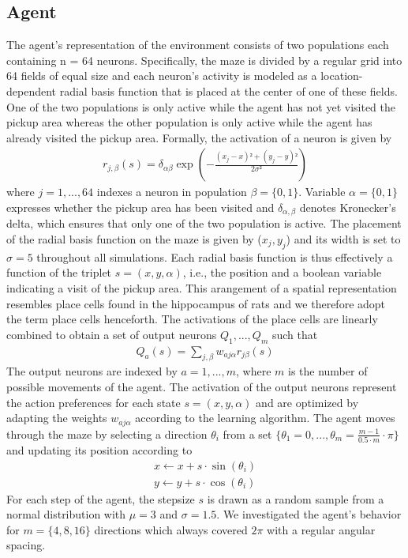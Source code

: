 \subsection{Agent}
The agent's representation of the environment consists of two populations each containing n = 64 neurons. Specifically, the maze is divided by a regular grid into 64 fields of equal size and each neuron's activity is modeled as a location-dependent radial basis function that is placed at the center of one of these fields. One of the two populations is only active while the agent has not yet visited the pickup area whereas the other population is only active while the agent has already visited the pickup area. Formally, the activation of a neuron is given by 
\begin{align}
r_{j, \beta}(s) = \delta_{\alpha \beta} \exp(-\frac{(x_j - x)² + (y_j - y)²}{2\sigma²})
\end{align}
where $j=1,...,64$ indexes a neuron in population $\beta = \{0,1\}$. Variable $\alpha = \{0,1\}$ expresses whether the pickup area has been visited and $\delta_{\alpha, \beta}$ denotes Kronecker's delta, which ensures that only one of the two population is active. The placement of the radial basis function on the maze is given by ($x_j, y_j$) and its width is set to $\sigma = 5$ throughout all simulations. Each radial basis function is thus effectively a function of the triplet $s=(x, y, \alpha)$, i.e., the position and a boolean variable indicating a visit of the pickup area. This arangement of a spatial representation resembles place cells found in the hippocampus of rats and we therefore adopt the term place cells henceforth. The activations of the place cells are linearly combined to obtain a set of output neurons $Q_1,...,Q_m$ such that
\begin{align}
Q_a(s) = \sum_{j, \beta}w_{a j \alpha} r_{j \beta}(s) 
\end{align}
The output neurons are indexed by $a = 1,...,m$, where $m$ is the number of possible movements of the agent. The activation of the output neurons represent the action preferences for each state $s=(x,y,\alpha)$ and are optimized by adapting the weights $w_{aj\alpha}$ according to the learning algorithm. The agent moves through the maze by selecting a direction $\theta_i$ from a set $\{\theta_1 = 0,...,\theta_m = \frac{m-1}{0.5 \cdot m} \cdot \pi\}$ and updating its position according to
\begin{align}
x \leftarrow x + s \cdot \sin(\theta_i)\\
y \leftarrow y + s \cdot \cos(\theta_i)
\end{align}
For each step of the agent, the stepsize $s$ is drawn as a random sample from a normal distribution with $\mu = 3$ and $\sigma = 1.5$. We investigated the agent's behavior for $m = \{4, 8, 16\}$ directions which always covered $2\pi$ with a regular angular spacing. 

